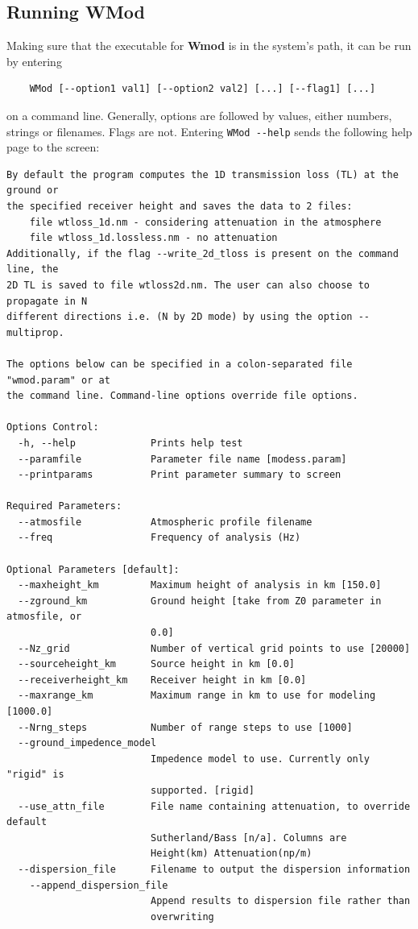 \subsection{Running WMod}
\label{sec:running wmod}

Making sure that the executable for {\bf Wmod} is in the system's path, it can be run by entering 
\begin{verbatim} 
    WMod [--option1 val1] [--option2 val2] [...] [--flag1] [...] 
\end{verbatim}
on a command line. Generally, options are followed by values, either numbers, strings or filenames. Flags are not. Entering \verb"WMod --help" sends the following help page to the screen: 

\begin{verbatim}
By default the program computes the 1D transmission loss (TL) at the ground or
the specified receiver height and saves the data to 2 files:
    file wtloss_1d.nm - considering attenuation in the atmosphere
    file wtloss_1d.lossless.nm - no attenuation
Additionally, if the flag --write_2d_tloss is present on the command line, the
2D TL is saved to file wtloss2d.nm. The user can also choose to propagate in N
different directions i.e. (N by 2D mode) by using the option --multiprop.

The options below can be specified in a colon-separated file "wmod.param" or at
the command line. Command-line options override file options.

Options Control:
  -h, --help             Prints help test
  --paramfile            Parameter file name [modess.param]
  --printparams          Print parameter summary to screen

Required Parameters:
  --atmosfile            Atmospheric profile filename
  --freq                 Frequency of analysis (Hz)

Optional Parameters [default]:
  --maxheight_km         Maximum height of analysis in km [150.0]
  --zground_km           Ground height [take from Z0 parameter in atmosfile, or
                         0.0]
  --Nz_grid              Number of vertical grid points to use [20000]
  --sourceheight_km      Source height in km [0.0]
  --receiverheight_km    Receiver height in km [0.0]
  --maxrange_km          Maximum range in km to use for modeling [1000.0]
  --Nrng_steps           Number of range steps to use [1000]
  --ground_impedence_model
                         Impedence model to use. Currently only "rigid" is
                         supported. [rigid]
  --use_attn_file        File name containing attenuation, to override default
                         Sutherland/Bass [n/a]. Columns are
                         Height(km) Attenuation(np/m)
  --dispersion_file      Filename to output the dispersion information
    --append_dispersion_file
                         Append results to dispersion file rather than
                         overwriting


\end{verbatim}
